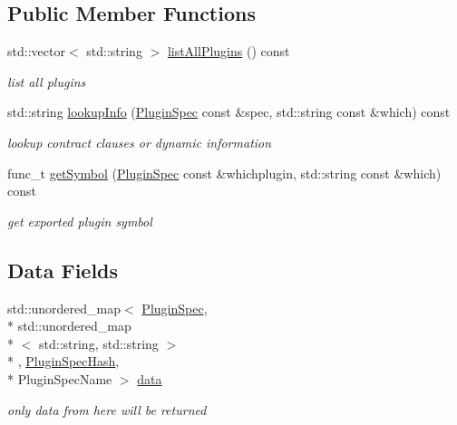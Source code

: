 \subsection*{Public Member Functions}
\begin{DoxyCompactItemize}
\item 
std\+::vector$<$ std\+::string $>$ \hyperlink{classkdb_1_1tools_1_1MockPluginDatabase_afb3aef79c6e8447f2555dae303ce1893}{list\+All\+Plugins} () const 
\begin{DoxyCompactList}\small\item\em list all plugins \end{DoxyCompactList}\item 
std\+::string \hyperlink{classkdb_1_1tools_1_1MockPluginDatabase_af1e8fa2f1ff8a1c5ac7005dd65101e93}{lookup\+Info} (\hyperlink{classkdb_1_1tools_1_1PluginSpec}{Plugin\+Spec} const \&spec, std\+::string const \&which) const 
\begin{DoxyCompactList}\small\item\em lookup contract clauses or dynamic information \end{DoxyCompactList}\item 
func\+\_\+t \hyperlink{classkdb_1_1tools_1_1MockPluginDatabase_acd897bc945b2b57620c2bf1860be515d}{get\+Symbol} (\hyperlink{classkdb_1_1tools_1_1PluginSpec}{Plugin\+Spec} const \&whichplugin, std\+::string const \&which) const 
\begin{DoxyCompactList}\small\item\em get exported plugin symbol \end{DoxyCompactList}\end{DoxyCompactItemize}
\subsection*{Data Fields}
\begin{DoxyCompactItemize}
\item 
std\+::unordered\+\_\+map$<$ \hyperlink{classkdb_1_1tools_1_1PluginSpec}{Plugin\+Spec}, \\*
std\+::unordered\+\_\+map\\*
$<$ std\+::string, std\+::string $>$\\*
, \hyperlink{structkdb_1_1tools_1_1PluginSpecHash}{Plugin\+Spec\+Hash}, \\*
Plugin\+Spec\+Name $>$ \hyperlink{classkdb_1_1tools_1_1MockPluginDatabase_a5de7756d9e7fb78d53903c92208d7fbe}{data}
\begin{DoxyCompactList}\small\item\em only data from here will be returned \end{DoxyCompactList}\end{DoxyCompactItemize}
